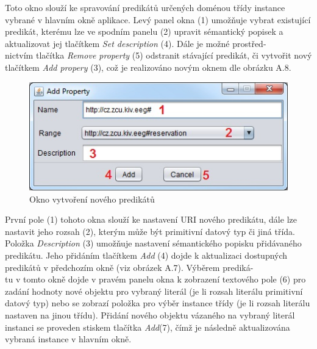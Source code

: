 \documentclass{projekt}
\begin{document}
\thispagestyle{plain}

Toto okno slouží ke spravování predikátů určených doménou třídy instance vybrané v hlavním okně aplikace. Levý panel okna (1) umožňuje vybrat existující predikát, kterému lze ve spodním panelu (2) upravit sémantický popisek a aktualizovat jej tlačítkem {\it Set description} (4). Dále je možné prostřed-\\nictvím tlačítka {\it Remove property} (5) odstranit stávající predikát, či vytvořit nový tlačítkem {\it Add propery} (3), což je realizováno novým oknem dle obrázku A.8.


\begin{figure}[htb!]
\begin{center}
\includegraphics[scale=0.72]{manualTestAddProperty.jpg}
\caption{Okno vytvoření nového predikátů}
\end{center}
\end{figure}


První pole (1) tohoto okna slouží ke nastavení URI nového predikátu, dále lze nastavit jeho rozsah (2), kterým může být primitivní datový typ či jiná třída. Položka {\it Description} (3) umožňuje nastavení sémantického popisku přidávaného predikátu. Jeho přidáním tlačítkem {\it Add} (4) dojde k aktualizaci dostupných predikátů v předchozím okně (viz obrázek A.7). Výběrem prediká-\\tu v tomto okně dojde v pravém panelu okna k zobrazení textového pole (6) pro zadání hodnoty nové objektu pro vybraný literál (je li rozsah literálu primitivní datový typ) nebo se zobrazí položka pro výběr instance třídy (je li rozsah literálu nastaven na jinou třídu). Přidání nového objektu vázaného na vybraný literál instanci se proveden stiskem tlačítka {\it Add}(7), čímž je následně aktualizována vybraná instance v hlavním okně.

\thispagestyle{plain}


\newpage
\thispagestyle{plain}
\end{document}
